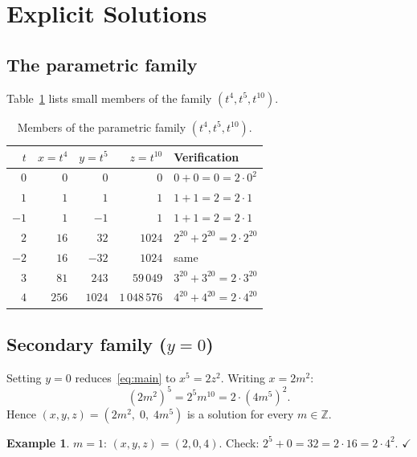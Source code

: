 \documentclass[12pt,a4paper]{article}
\theoremstyle{definition}
\newtheorem{example}[theorem]{Example}
\newcommand{\Z}{\mathbb{Z}}
\begin{document}
\section{Explicit Solutions}\label{sec:explicit}

\subsection{The parametric family}

Table~\ref{tab:family} lists small members of the family $(t^4, t^5, t^{10})$.

\begin{table}[h]
\centering
\caption{Members of the parametric family $(t^4, t^5, t^{10})$.}
\label{tab:family}
\renewcommand{\arraystretch}{1.2}
\begin{tabular}{rrrrl}
\toprule
$t$ & $x = t^4$ & $y = t^5$ & $z = t^{10}$ & Verification \\
\midrule
$0$  & $0$   & $0$    & $0$      & $0 + 0 = 0 = 2 \cdot 0^2$ \\
$1$  & $1$   & $1$    & $1$      & $1 + 1 = 2 = 2 \cdot 1$ \\
$-1$ & $1$   & $-1$   & $1$      & $1 + 1 = 2 = 2 \cdot 1$ \\
$2$  & $16$  & $32$   & $1024$   & $2^{20} + 2^{20} = 2 \cdot 2^{20}$ \\
$-2$ & $16$  & $-32$  & $1024$   & same \\
$3$  & $81$  & $243$  & $59\,049$ & $3^{20} + 3^{20} = 2 \cdot 3^{20}$ \\
$4$  & $256$ & $1024$ & $1\,048\,576$ & $4^{20} + 4^{20} = 2 \cdot 4^{20}$ \\
\bottomrule
\end{tabular}
\end{table}

\subsection{Secondary family ($y = 0$)}

Setting $y = 0$ reduces~\eqref{eq:main} to $x^5 = 2z^2$.  Writing $x = 2m^2$:
\[
  (2m^2)^5 = 2^5 m^{10} = 2 \cdot (4m^5)^2.
\]
Hence $(x,y,z) = (2m^2,\; 0,\; 4m^5)$ is a solution for every $m \in \Z$.

\begin{example}
  $m = 1$: $(x,y,z) = (2, 0, 4)$.  Check: $2^5 + 0 = 32 = 2 \cdot 16 = 2 \cdot 4^2$. $\checkmark$
\end{example}
\end{document}
